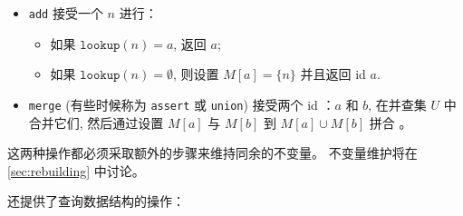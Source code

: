 \begin{itemize}
    \item \texttt{add} 接受一个 \enode $n$ 进行：
    \begin{itemize}
        \item 如果 $\texttt{lookup}(n) = a$, 返回 $a$;
        \item 如果 $\texttt{lookup}(n) = \emptyset$,
              则设置 $M[a] = \{ n \}$ 并且返回 id $a$.
    \end{itemize}
    \item \texttt{merge} (有些时候称为 \texttt{assert} 或 \texttt{union})
    接受两个 \eclass id ：$a$ 和 $b$,
    在并查集 $U$ 中合并它们, 
    然后通过设置 $M[a]$ 与 $M[b]$ 到 $M[a] \cup M[b]$ 拼合 \eclasses 。 %
\end{itemize}

这两种操作都必须采取额外的步骤来维持同余的不变量。
不变量维护将在 \autoref{sec:rebuilding} 中讨论。

\Egraphs 还提供了查询数据结构的操作：

